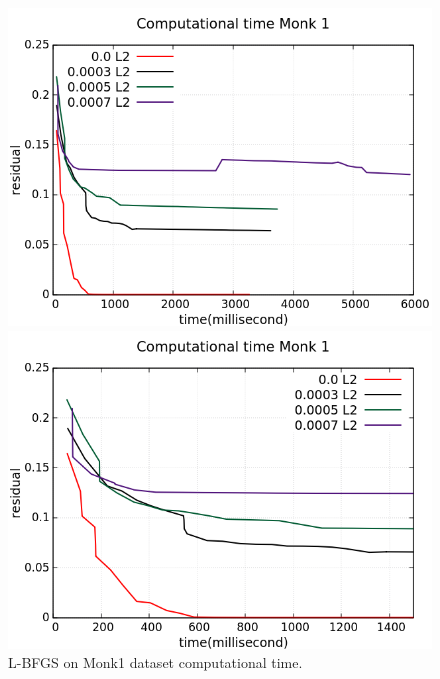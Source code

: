 \begin{figure}[H]
	\centering
	\begin{minipage}[t]{0.5\linewidth}
		\includegraphics[width=\linewidth]{data/LBFGS/Monk1/Monk1_LBFGS_CT_standard.png}
	\end{minipage}%
	\begin{minipage}[t]{0.5\linewidth}
		\includegraphics[width=\linewidth]{data/LBFGS/Monk1/Monk1_LBFGS_CT_zoom.png}
	\end{minipage}
	\caption{L-BFGS on Monk1 dataset computational time.}
\end{figure}
